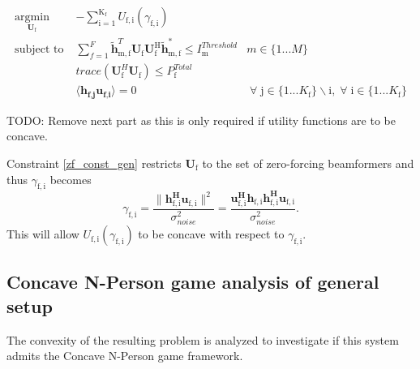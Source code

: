 \documentclass[12pt,a4paper]{report}
\begin{document}
	\begin{subequations}
	\label{optim}
	\begin{align}
	    \underset{\mathbf{U}_{\mathrm{f}} }{\text{argmin}} \;
	    & - \sum_{\mathrm{i=1}}^{\mathrm{K_f}}
    	U_{\mathrm{f,i}}(\gamma_{\mathrm{f,i}}) \label{player_opt} \\
	    \text{subject to} \; &
	   \sum^F_{f=1} \mathbf{\tilde{h}}_{\mathrm{m,f}}^T  \mathbf{U_{\mathrm{f}}}		
	\mathbf{U_{\mathrm{f}}^{\mathrm{H}}} \mathbf{\tilde{h}_{\mathrm{m,f}}^*} \leq I^{Threshold}		
	_{\mathrm{m}} & m \in \{1 ...M\} 
		\label{interference_const_gen}\\
        & trace(\mathbf{U}_{\text{f}}^H\mathbf{U}_{\text{f}}) \leq P^{Total}_{\text{f}} \label{power_const_gen}\\
        & \langle \mathbf{h_{\text{f,j}}}\mathbf{u_{\text{f,i}}} \rangle =0\ & \; \forall \; \text{j} \in \{1... K_{\text{f}}\}\backslash \text{i} ,\; \forall \; \text{i} \in \{1 ... K_{\text{f}}\} \label{zf_const_gen}
	\end{align}
	\end{subequations}

TODO: Remove next part as this is only required if utility functions are to be concave. 

Constraint \eqref{zf_const_gen} restricts $\mathbf{U}_{\mathrm{f}}$ to the set of zero-forcing beamformers and thus  
	$\gamma_{\mathrm{f,i}}$ becomes
	\begin{equation}\label{zf_snr}
	\gamma_{\mathrm{f,i}} = \frac{\|\mathbf{h^H_{\mathrm{f,i}}u_{\mathrm{f,i}}}\|^2}
	{\sigma^2_{noise}  
	}
	= 
	\frac{\mathbf{u^H_{\mathrm{f,i}}h_{\mathrm{f,i}}h^H_{\mathrm{f,i}}u_{\mathrm{f,i}}}}
	{\sigma^2_{noise}  
	}.
	\end{equation}
	This will allow $U_{\mathrm{f,i}}(\gamma_{\mathrm{f,i}}) $ to be concave with respect to $\gamma_{\mathrm{f,i}}$.
	
\subsection{Concave N-Person game analysis of general setup}
The convexity of the resulting problem is analyzed to investigate if this system admits the Concave N-Person game framework. 
\end{document}
